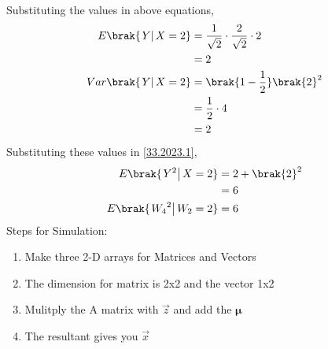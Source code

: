 \documentclass[journal,12pt,twocolumn]{IEEEtran}
\theoremstyle{remark}
\begin{document}
Substituting the values in above equations,
\begin{align}
E\brak{\left.Y\right | X=2} &= \frac{1}{\sqrt{2}}\cdot\frac{2}{\sqrt{2}}\cdot 2\\
			    &= 2\\
Var\brak{\left.Y\right | X=2} &= \brak{1 - \frac{1}{2}}\brak{2}^2\\
			      &= \frac{1}{2}\cdot 4\\
			      &= 2
\end{align}
Substituting these values in \eqref{33.2023.1},
\begin{align}
E\brak{\left.Y^2\right | X=2} &= 2 + \brak{2}^2\\
			      &= 6\\
E\brak{\left.{W_4}^2\right | W_2=2} &= 6
\end{align}
\newline\newline\newline
Steps for Simulation:
\begin{enumerate}
\item Make three 2-D arrays for Matrices and Vectors
\item The dimension for matrix is 2x2 and the vector 1x2
\item Mulitply the A matrix with $\vec{z}$ and add the $\bm{\mu}$
\item The resultant gives you $\vec{x}$
\end{enumerate}
\end{document}
